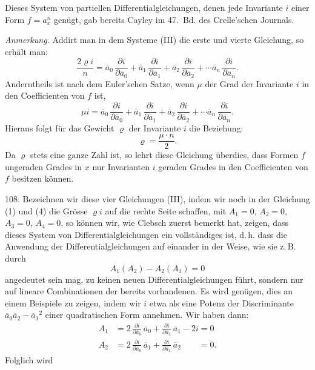Dieses System von partiellen Differentialgleichungen, denen jede Invariante
 $i$ einer Form $f = a_x^n$ genügt, gab bereits Cayley im 47.\ Bd.
des Crelle'schen Journals.

\textit{Anmerkung.} Addirt man in dem Systeme (III) die erste und
vierte Gleichung, so erhält man:
\[
\frac{2\varrho i}{n} = \overline{a}_0\,\frac{\partial i}{\partial \overline{a}_0} + \overline{a}_1\,\frac{\partial i}{\partial \overline{a}_1} + \overline{a}_2\,\frac{\partial i}{\partial \overline{a}_2} + \cdots \overline{a}_n\,\frac{\partial i}{\partial \overline{a}_n}.
\]
Anderntheils ist nach dem Euler'schen Satze, wenn $\mu$ der Grad der
Invariante $i$ in den Coefficienten von $f$ ist,
\[
\mu i = \overline{a}_0\,\frac{\partial i}{\partial \overline{a}_0} + \overline{a}_1\,\frac{\partial i}{\partial \overline{a}_1} + \overline{a}_2\,\frac{\partial i}{\partial \overline{a}_2} + \cdots \overline{a}_n\,\frac{\partial i}{\partial \overline{a}_n}.
\]
Hieraus folgt für das Gewicht $\varrho$ der Invariante $i$ die Beziehung:
\[
\varrho = \frac{\mu \cdot n}{2}.
\]
Da $\varrho$ stets eine ganze Zahl ist, so lehrt diese Gleichung überdies,
dass Formen $f$ ungeraden Grades in $x$ nur Invarianten $i$ geraden Grades
in den Coefficienten von $f$ besitzen können.

108.  Bezeichnen
 wir diese vier Gleichungen (III), indem wir noch in der Gleichung
(1) und (4) die Grösse $\varrho i$ auf die rechte Seite schaffen, mit $A_1 = 0$,
$A_2 = 0$, $A_3 = 0$, $A_4 = 0$, so können wir, wie Clebsch zuerst bemerkt
 hat, zeigen, dass dieses System von Differentialgleichungen ein
vollständiges ist, d.\,h. dass die Anwendung der Differentialgleichungen
auf einander in der Weise, wie sie z.\,B. durch
\[
A_1(A_2) - A_2(A_1) = 0
\]
angedeutet sein mag, zu keinen neuen Differentialgleichungen führt,
sondern nur auf lineare Combinationen der bereits vorhandenen. Es
wird genügen, dies an einem Beispiele zu zeigen, indem wir $i$ etwa
als eine Potenz der Discriminante $\overline{a}_0 \overline{a}_2 - \overline{a}_1{}^2$ einer quadratischen Form
annehmen. Wir haben dann:
\[
\begin{aligned}
A_1 &= 2\,\frac{\partial i}{\partial \overline{a}_0}\,\overline{a}_0 + \frac{\partial i}{\partial \overline{a}_1}\,\overline{a}_1 - 2i = 0\\
A_2 &= 2\,\frac{\partial i}{\partial \overline{a}_0}\,\overline{a}_1 + \frac{\partial i}{\partial \overline{a}_1}\,\overline{a}_2 \phantom{{}-2i{}} = 0.
\end{aligned}
\]
Folglich wird


